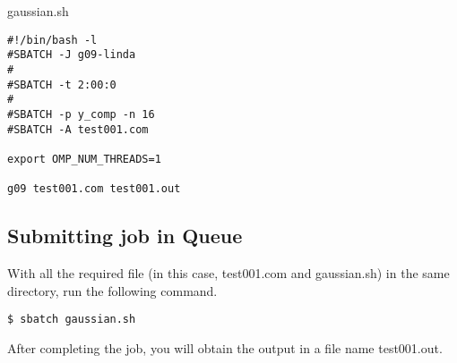 \documentclass[11pt]{article}
\numberwithin{figure}{section}
\begin{document}
gaussian.sh
\begin{lstlisting}[frame=single]
#!/bin/bash -l
#SBATCH -J g09-linda
#
#SBATCH -t 2:00:0
#
#SBATCH -p y_comp -n 16
#SBATCH -A test001.com

export OMP_NUM_THREADS=1

g09 test001.com test001.out
\end{lstlisting}


\subsection{Submitting job in Queue}
With all the required file (in this case, test001.com and gaussian.sh) in
the same directory, run the following command.

\begin{lstlisting}[frame=single]
$ sbatch gaussian.sh
\end{lstlisting}

After completing the job, you will obtain the output in a file name
test001.out.
\end{document}
